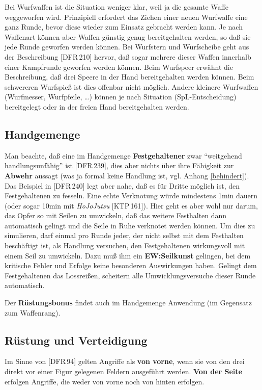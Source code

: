 \documentclass[10pt,a4paper,germanpar]{article}
\begin{document}
Bei Wurfwaffen ist die Situation weniger klar, weil ja die gesamte
Waffe weggeworfen wird. Prinzipiell erfordert das Ziehen einer neuen
Wurfwaffe eine ganz Runde, bevor diese wieder zum Einsatz gebracht
werden kann. Je nach Waffenart können aber Waffen günstig genug
bereitgehalten werden, so daß sie jede Runde geworfen werden
können. Bei Wurfstern und Wurfscheibe geht aus der Beschreibung
[DFR\,210] hervor, daß sogar mehrere dieser Waffen innerhalb einer
Kampfrunde geworfen werden können. Beim Wurfspeer erwähnt die
Beschreibung, daß drei Speere in der Hand bereitgehalten werden
können. Beim schwereren Wurfspieß ist dies offenbar nicht
möglich. Andere kleinere Wurfwaffen (Wurfmesser, Wurfpfeile, \dots)
können je nach Situation (SpL-Entscheidung) bereitgelegt oder
in der freien Hand bereitgehalten werden.

\subsection{Handgemenge}

Man beachte, daß eine im Handgemenge \textbf{Festgehaltener} zwar
"`weitgehend handlungsunfähig"' ist [DFR\,239], dies aber nichts über
ihre Fähigkeit zur \textbf{Abwehr} aussagt (was ja formal keine Handlung
ist, vgl. Anhang \ref{behindert}). Das Beispiel in [DFR\,240] legt
aber nahe, daß es für Dritte möglich ist, den Festgehaltenen zu
fesseln. Eine echte Verknotung würde mindestens 1min dauern (oder
sogar 10min mit \emph{HoJoJutsu} [KTP\,161]). Hier geht es aber wohl
nur darum, das Opfer so mit Seilen zu umwickeln, daß das weitere
Festhalten dann automatisch gelingt und die Seile in Ruhe verknotet
werden können. Um dies zu simulieren, darf einmal pro Runde jeder, der
nicht selbst mit dem Festhalten beschäftigt ist, als Handlung
versuchen, den Festgehaltenen wirkungsvoll mit einem Seil zu
umwickeln. Dazu muß ihm ein \textbf{EW:Seilkunst} gelingen, bei dem
kritische Fehler und Erfolge keine besonderen Auswirkungen
haben. Gelingt dem Festgehaltenen das Lossreißen, scheitern alle
Umwicklungsversuche dieser Runde automatisch.

Der \textbf{Rüstungsbonus} findet auch im Handgemenge Anwendung (im
Gegensatz zum Waffenrang).

\subsection{Rüstung und Verteidigung}

Im Sinne von [DFR\,94] gelten Angriffe als \textbf{von vorne}, wenn
sie von den drei direkt vor einer Figur gelegenen Feldern ausgeführt
werden. \textbf{Von der Seite} erfolgen Angriffe, die weder von vorne
noch von hinten erfolgen.
\end{document}
